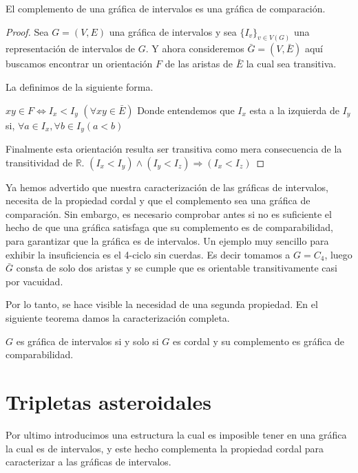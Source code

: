 \begin{teorema}
    \label{teo:Int-Comprbldd}
    El complemento de una gráfica de intervalos es una gráfica de comparación.
\end{teorema}

\begin{proof}
    Sea $G=(V,E)$ una gráfica de intervalos y sea $\{I_v \}_{v\in V(G)}$ una
    representación de intervalos de $G$. Y ahora consideremos $ \bar{G} =(V,
    \bar{E})$ aquí buscamos encontrar un orientación $F$ de las aristas de
    $\bar{E}$ la cual sea transitiva.
    
    La definimos de la siguiente forma.
    
    $xy\in F \iff I_x<I_y$ $(\forall xy\in \bar{E})$ Donde entendemos que $I_x$
    esta a la izquierda de $I_y$ si, $\forall a\in I_x, \forall b \in I_y(a<b)$

    Finalmente esta orientación resulta ser transitiva como mera consecuencia de
    la transitividad de $\mathbb{R}$. $(I_x < I_y) \wedge (I_y < I_z)
    \Rightarrow (I_x<I_z) $
\end{proof}

Ya hemos advertido que nuestra caracterización de las gráficas de intervalos,
necesita de la propiedad cordal y que el complemento sea una gráfica de
comparación. Sin embargo, es necesario comprobar antes si no es suficiente el
hecho de que una gráfica satisfaga que su complemento es de comparabilidad, para
garantizar que la gráfica es de intervalos. Un ejemplo muy sencillo para exhibir
la insuficiencia es el 4-ciclo sin cuerdas. Es decir tomamos a $G=C_4$, luego
$\bar{G}$ consta de solo dos aristas y se cumple que es orientable
transitivamente casi por vacuidad.

Por lo tanto, se hace visible la necesidad de una segunda propiedad. En el
siguiente teorema damos la caracterización completa.

\begin{teorema}
\label{teo:Crctzn1}
    $G$ es gráfica de intervalos si y solo si $G$ es cordal y su complemento es
    gráfica de comparabilidad.
\end{teorema}

\section{Tripletas asteroidales}
\label{sec:AstTrpls}
Por ultimo introducimos una estructura la cual es imposible tener en una gráfica
la cual es de intervalos, y este hecho complementa la propiedad cordal para
caracterizar a las gráficas de intervalos.

